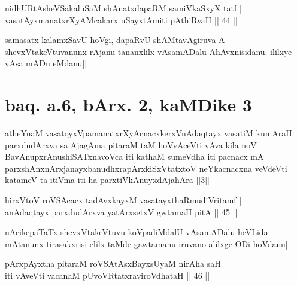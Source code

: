 
\begin{shl}
nidhURtAsheVSakaluSaM shAnatxdapaRM samiVkaSxyX tatf | \\
vasatAyx\s \s manatxrXyAMcakarx uSayxtAmiti pAthiRvaH \hfill|| 44 || 
\end{shl}

\begin{artha}
samasatx kalamxSavU hoVgi, dapaRvU shAMtavAgiruva A 
shevxVtakeVtuvanunx rAjanu tananxlilx vAsamADalu AhAvxnisidanu. 
ililxye vAsa mADu eMdanu||
\end{artha}

\section*{baq. a.6, bArx. 2, kaMDike 3}

\begin{shl}
atheYnaM vasatoyxVpamanatxrXyAcnacxkerxV\s nAdaqtayx vasatiM kumAraH parxdudArxva sa AjagAma pitaraM taM hoVvAceVti vAva kila noV BavAnupxrAnushiSATxnavoVca iti kathaM sumeVdha iti pacnacx mA parxshAnxnArxjanayxbanudhxrapArxkiSxVtatxtoV neYkacnacxna veVdeVti katameV ta itiVma iti ha parxtiVkAnuyxdAjahAra ||3||
\end{shl}


\begin{shl}
hirxVtoV roVSAcacx tadAvxkayxM vasatayxthaRmudiVritamf | \\
anAdaqtayx parxdudArxva yatArx\s \s setxV gwtamaH pitA \hfill|| 45 || 
\end{shl}

\begin{artha}
nAcikepaTaTx shevxVtakeVtuvu koVpadiMdalU vAsamADalu heVLida mAtanunx 
tirasakxrisi elilx taMde gawtamanu iruvano alilxge ODi hoVdanu||
\end{artha}

\begin{shl}
pArxpAyxtha pitaraM roVSAtAsxBayxsUyaM nirAha saH | \\
iti vAveVti vacanaM pUvoVRtatxraviroVdhataH \hfill|| 46 || 
\end{shl}

